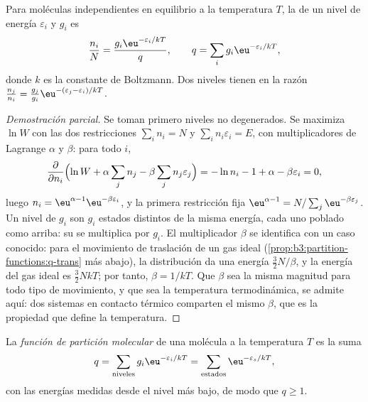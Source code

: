 \begin{theorem}\label{thm:b3:partition-functions:boltzmann}
Para moléculas independientes en equilibrio a la temperatura $T$, la  de un
nivel de energía $\varepsilon_i$ y  $g_i$ es
\[
  \frac{n_i}{N} = \frac{g_i\eu^{-\varepsilon_i/kT}}{q},
  \qquad q = \sum_i g_i\eu^{-\varepsilon_i/kT},
\]
donde $k$ es la constante de Boltzmann. Dos niveles tienen  en la razón
$\frac{n_j}{n_i} = \frac{g_j}{g_i}\eu^{-(\varepsilon_j - \varepsilon_i)/kT}$.
\end{theorem}

\begin{proof}[Demostración parcial]
Se toman primero niveles no degenerados. Se maximiza $\ln W$ con las dos restricciones
$\sum_in_i = N$ y $\sum_in_i\varepsilon_i = E$, con multiplicadores de Lagrange $\alpha$ y $\beta$:
para todo $i$,
\[
  \frac{\partial}{\partial n_i}\Bigl(\ln W + \alpha\sum_jn_j - \beta\sum_jn_j\varepsilon_j\Bigr)
  = -\ln n_i - 1 + \alpha - \beta\varepsilon_i = 0,
\]
luego $n_i = \eu^{\alpha - 1}\eu^{-\beta\varepsilon_i}$, y la primera restricción fija $\eu^{\alpha - 1}
= N/\sum_j\eu^{-\beta\varepsilon_j}$. Un nivel de  $g_i$ son $g_i$ estados distintos de
la misma energía, cada uno poblado como arriba: su  se multiplica por
$g_i$. El multiplicador $\beta$ se identifica con un caso conocido: para el
movimiento de traslación de un gas ideal (\cref{prop:b3:partition-functions:q-trans}
más abajo), la distribución da una energía $\frac32N/\beta$, y la energía del gas
ideal es $\frac32NkT$; por tanto, $\beta = 1/kT$. Que $\beta$ sea la misma magnitud para todo
tipo de movimiento, y que sea la temperatura termodinámica, se admite
aquí: dos sistemas en contacto térmico comparten el mismo $\beta$, que es la propiedad que
define la temperatura.
\end{proof}

\begin{definition}\label{def:b3:partition-functions:partition-function}
La \emph{función de partición molecular} de una
molécula a la temperatura $T$ es la suma
\[
  q = \sum_{\text{niveles}}g_i\eu^{-\varepsilon_i/kT} = \sum_{\text{estados}}\eu^{-\varepsilon_s/kT},
\]
con las energías medidas desde el nivel más bajo, de modo que $q \ge 1$.
\end{definition}

